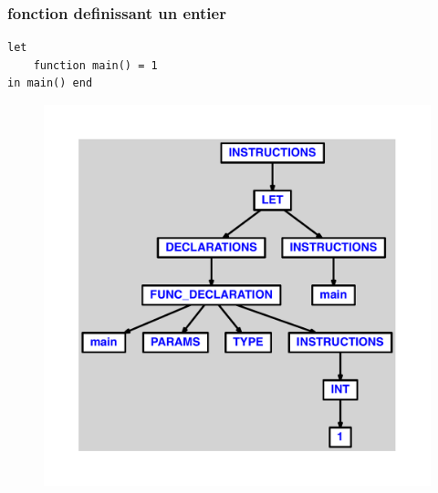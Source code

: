 \documentclass{article}
\begin{document}
\subsubsection{fonction definissant un entier}
\begin{lstlisting}
let
	function main() = 1
in main() end
\end{lstlisting}
\newpage
\begin{figure}[H]
\centering
\includegraphics[max width=\textwidth]{ast/ast_230.pdf}
\end{figure}
\newpage
\end{document}

